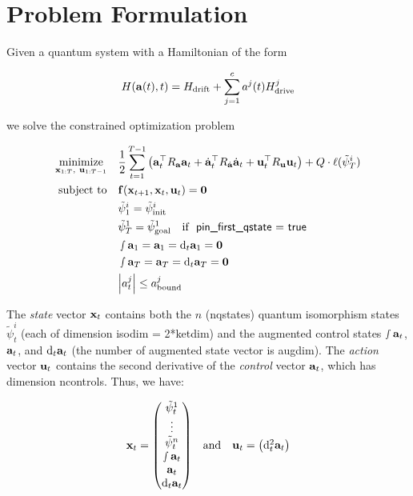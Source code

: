 \documentclass{article}
\newcommand{\isopsi}{\tilde \psi}
\begin{document}
\section{Problem Formulation}

Given a quantum system with a Hamiltonian of the form

$$
H(\vb{{a}}(t), t ) = H_{\text{drift}} + \sum_{j=1}^c a^j(t) H_{\text{drive}}^j
$$

we solve the constrained optimization problem

\begin{align*}
  \underset{\vb{x}_{1:T}, \ \vb{u}_{1:T-1}}{\text{minimize}} \quad
    & \frac{1}{2} \sum_{t=1}^{T-1} \qty(\vb{a}_t^\top R_{\vb{a}} \vb{a}_t + \dot{\vb{a}}_t^\top R_{\dot{\vb{a}}} \dot{\vb{a}}_t + \vb{u}_t^\top R_{\vb{u}} \vb{u}_t) + Q \cdot \ell(\isopsi_T^i)\\ 
  \text{subject to} \quad 
    & \vb{f}(\vb{x}_{t+1}, \vb{x}_t, \vb{u}_t) = \vb{0}  \\
    &  \isopsi^i_1 = \isopsi^i_\text{init} \\
    & \isopsi^1_T = \isopsi^1_\text{goal} \quad \text{if }\ \textsf{pin\_first\_qstate = true}\\
    & \smallint \vb{a}_1 = \vb{a}_1 = \dd_t \vb{a}_1 = \vb{0} \\  
    & \smallint \vb{a}_T = \vb{a}_T = \dd_t \vb{a}_T = \vb{0} \\
    & \abs{a^j_t} \leq a^j_\text{bound} \\
\end{align*}


The \textit{state} vector $\vb{x}_t$ contains both the $n$ (\textsf{nqstates}) quantum isomorphism states $\isopsi^i_t$ (each of dimension \textsf{isodim = 2*ketdim}) and the augmented control states $\smallint \vb{a}_t$, $\vb{a}_t$, and $\dd_t \vb{a}_t$ (the number of augmented state vector is \textsf{augdim}). The \textit{action} vector $\vb{u}_t$ contains the second derivative of the \textit{control} vector $\vb{a}_t$, which has dimension \textsf{ncontrols}. Thus, we have:

\begin{equation}
  \vb{x}_t = \mqty(
    \isopsi^1_t \\ 
    \vdots \\ 
    \isopsi^n_t \\ 
    \smallint \vb{a}_t \\ 
    \vb{a}_t \\ 
    \dd_t \vb{a}_t 
  )
  \quad \text{and} \quad 
  \vb{u}_t = \mqty(
    \dd^2_t \vb{a}_t
  )
\end{equation}
\end{document}
